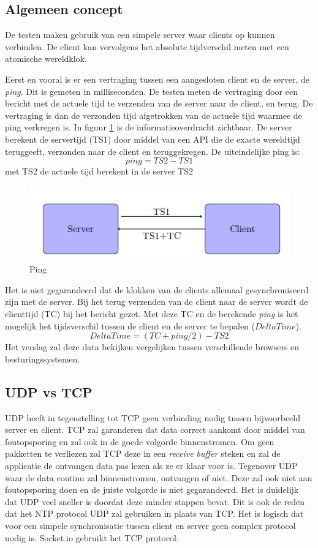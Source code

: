 \subsection{Algemeen concept}
De testen maken gebruik van een simpele server waar clients op kunnen verbinden. De client kan vervolgens het absolute tijdverschil meten met een atomische wereldklok.

Eerst en vooral is er een vertraging tussen een aangesloten client en de server, de {\it ping}. Dit is gemeten in milliseconden. De testen meten de vertraging door een bericht met de actuele tijd te verzenden van de server naar de client, en terug. De vertraging is dan de verzonden tijd afgetrokken van de actuele tijd waarmee de ping verkregen is.
In figuur \ref{ping} is de informatieoverdracht zichtbaar. De server berekent de servertijd (TS1) door middel van een API die de exacte wereldtijd teruggeeft, verzonden naar de client en teruggekregen. De uiteindelijke ping is: \[ping = TS2 - TS1\] met TS2 de actuele tijd berekent in de server TS2

\begin{figure}[h]
\centering
\includegraphics[scale=0.8]{img/img.png}
\caption{Ping} \label{ping}
\end{figure}


Het is niet gegarandeerd dat de klokken van de clients allemaal gesynchroniseerd zijn met de server. Bij het terug verzenden van de client naar de server wordt de clienttijd (TC) bij het bericht gezet.  Met deze TC en de berekende {\it ping} is het mogelijk het tijdsverschil tussen de client en de server te bepalen ($DeltaTime$).
\[DeltaTime = (TC+ping/2) - TS2\]
Het verslag zal deze data bekijken vergelijken tussen verschillende browsers en besturingssystemen.

\subsection{UDP vs TCP}

UDP heeft in tegenstelling tot TCP geen verbinding nodig tussen bijvoorbeeld server en client. TCP zal garanderen dat data correct aankomt door middel van foutopsporing en zal ook in de goede volgorde binnenstromen. Om geen pakketten te verliezen zal TCP deze in een {\it receive buffer} steken en zal de applicatie de ontvangen data pas lezen als ze er klaar voor is. Tegenover UDP waar de data continu zal binnenstromen, ontvangen of niet. Deze zal ook niet aan foutopsporing doen en de juiste volgorde is niet gegarandeerd. Het is duidelijk dat UDP veel sneller is doordat deze minder stappen bevat. Dit is ook de reden dat het NTP protocol UDP zal gebruiken in plaats van TCP. Het is logisch dat voor een simpele synchronisatie tussen client en server geen complex protocol nodig is. Socket.io gebruikt het TCP protocol.


